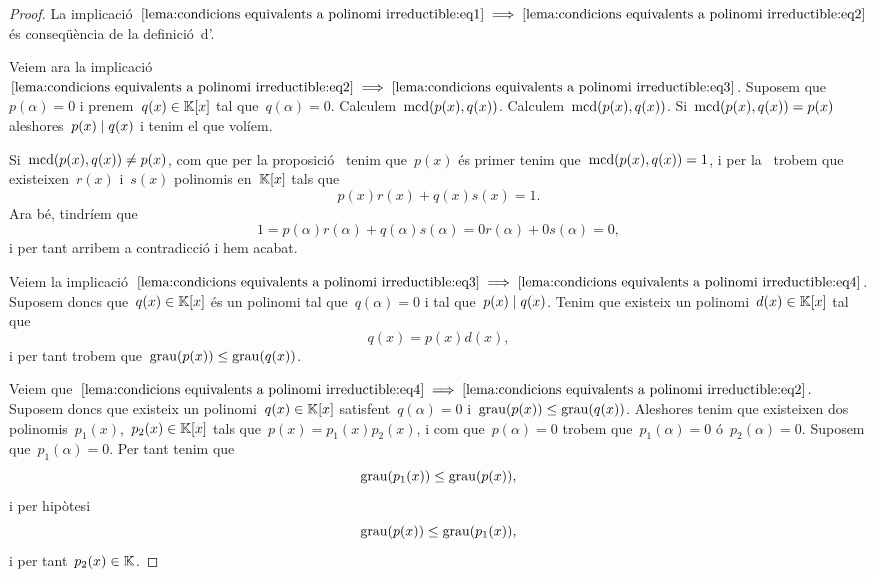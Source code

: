 \documentclass[../../main.tex]{subfiles}
\begin{document}
    \begin{proof}
        La implicació~\(\eqref{lema:condicions equivalents a polinomi irreductible:eq1}\implies\eqref{lema:condicions equivalents a polinomi irreductible:eq2}\) és conseqüència de la definició~d'.

        Veiem ara la implicació~\(\eqref{lema:condicions equivalents a polinomi irreductible:eq2}\implies\eqref{lema:condicions equivalents a polinomi irreductible:eq3}\).
        Suposem que~\(p(\alpha)=0\) i prenem~\(q(x)\in\mathbb{K}[x]\) tal que~\(q(\alpha)=0\).
        Calculem~\(\operatorname{mcd}(p(x),q(x))\).
        Calculem~\(\operatorname{mcd}(p(x),q(x))\).
        Si~\(\operatorname{mcd}(p(x),q(x))=p(x)\) aleshores~\(p(x)\mathrel{|} q(x)\) i tenim el que volíem.

        Si~\(\operatorname{mcd}(p(x),q(x))\neq p(x)\), com que per la proposició~ tenim que~\(p(x)\) és primer tenim que~\(\operatorname{mcd}(p(x),q(x))=1\), i per la~ trobem que existeixen~\(r(x)\) i~\(s(x)\) polinomis en~\(\mathbb{K}[x]\) tals que
        \[
            p(x)r(x)+q(x)s(x)=1.
        \]
        Ara bé, tindríem que
        \[
            1=p(\alpha)r(\alpha)+q(\alpha)s(\alpha)=0r(\alpha)+0s(\alpha)=0,
        \]
        i per tant arribem a contradicció i hem acabat.

        Veiem la implicació~\(\eqref{lema:condicions equivalents a polinomi irreductible:eq3}\implies\eqref{lema:condicions equivalents a polinomi irreductible:eq4}\).
        Suposem doncs que~\(q(x)\in\mathbb{K}[x]\) és un polinomi tal que~\(q(\alpha)=0\) i tal que~\(p(x)\mathrel{|} q(x)\).
        Tenim que existeix un polinomi~\(d(x)\in\mathbb{K}[x]\) tal que
        \[
            q(x)=p(x)d(x),
        \]
        i per tant trobem que~\(\operatorname{grau}(p(x))\leq\operatorname{grau}(q(x))\).

        Veiem que~\(\eqref{lema:condicions equivalents a polinomi irreductible:eq4}\implies\eqref{lema:condicions equivalents a polinomi irreductible:eq2}\).
        Suposem doncs que existeix un polinomi~\(q(x)\in\mathbb{K}[x]\) satisfent~\(q(\alpha)=0\) i~\(\operatorname{grau}(p(x))\leq\operatorname{grau}(q(x))\).
        Aleshores tenim que existeixen dos polinomis~\(p_{1}(x)\),~\(p_{2}(x)\in\mathbb{K}[x]\) tals que~\(p(x)=p_{1}(x)p_{2}(x)\), i com que~\(p(\alpha)=0\) trobem que~\(p_{1}(\alpha)=0\) ó~\(p_{2}(\alpha)=0\).
        Suposem que~\(p_{1}(\alpha)=0\).
        Per tant tenim que
        \[
            \operatorname{grau}(p_{1}(x))\leq\operatorname{grau}(p(x)),
        \]
        i per hipòtesi
        \[
            \operatorname{grau}(p(x))\leq\operatorname{grau}(p_{1}(x)),
        \]
        i per tant~\(p_{2}(x)\in\mathbb{K}\).


\end{proof}
\end{document}
